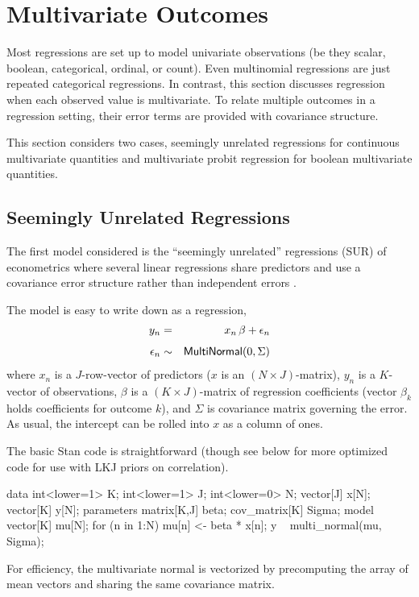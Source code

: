   

\section{Multivariate Outcomes}

Most regressions are set up to model univariate observations (be they
scalar, boolean, categorical, ordinal, or count).  Even multinomial
regressions are just repeated categorical regressions.  In contrast,
this section discusses regression when each observed value is
multivariate.  To relate multiple outcomes in a regression setting,
their error terms are provided with covariance structure.  

This section considers two cases, seemingly unrelated regressions for
continuous multivariate quantities and multivariate probit regression
for boolean multivariate quantities.

\subsection{Seemingly Unrelated Regressions} 

The first model considered is the ``seemingly unrelated'' regressions
(SUR) of econometrics where several linear regressions share
predictors and use a covariance error structure rather than
independent errors \citep{Zellner:1962,Greene:2011}.

The model is easy to write down as a regression,
%
\begin{eqnarray*}
 y_n & = & x_n \, \beta + \epsilon_n
\\[4pt]
 \epsilon_n & \sim & \distro{MultiNormal}(0, \Sigma)
\end{eqnarray*}
%
where $x_n$ is a $J$-row-vector of predictors ($x$ is an $(N \times
J)$-matrix), $y_n$ is a $K$-vector of observations, $\beta$ is a $(K
\times J)$-matrix of regression coefficients (vector $\beta_k$ holds
coefficients for outcome $k$), and $\Sigma$ is covariance matrix
governing the error.  As usual, the intercept can be rolled into $x$
as a column of ones.

The basic Stan code is straightforward (though see below for more
optimized code for use with LKJ priors on correlation).
%
\begin{stancode}
data {
  int<lower=1> K;
  int<lower=1> J;
  int<lower=0> N;
  vector[J] x[N];
  vector[K] y[N];
}
parameters {
  matrix[K,J] beta;
  cov_matrix[K] Sigma;
}
model {
  vector[K] mu[N];
  for (n in 1:N)
    mu[n] <- beta * x[n];
  y ~ multi_normal(mu, Sigma);
}
\end{stancode}
%
For efficiency, the multivariate normal is vectorized by precomputing
the array of mean vectors and sharing the same covariance matrix.

